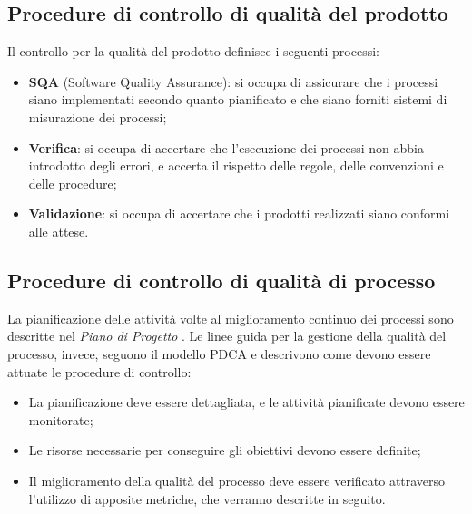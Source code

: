   \subsection{Procedure di controllo di qualità del prodotto}
    Il controllo per la qualità del prodotto definisce i seguenti processi:
    \begin{itemize}
      \item \textbf{SQA} (Software Quality Assurance): si occupa di assicurare
      che i processi siano implementati secondo quanto pianificato e che siano
      forniti sistemi di misurazione dei processi;
      \item \textbf{Verifica}: si occupa di accertare che l’esecuzione dei
      processi non abbia introdotto degli errori, e accerta il rispetto delle
      regole, delle convenzioni e delle procedure;
      \item \textbf{Validazione}: si occupa di accertare che i prodotti
      realizzati siano conformi alle attese.
    \end{itemize}

  \subsection{Procedure di controllo di qualità di processo}
  La pianificazione delle attività volte al miglioramento continuo dei processi
  sono descritte nel \emph{Piano di Progetto \VersionePP{}}. Le linee guida per
  la gestione della qualità del processo, invece, seguono il modello PDCA e
  descrivono come devono essere attuate le procedure di controllo:
  \begin{itemize}
    \item La pianificazione deve essere dettagliata, e le attività pianificate
    devono essere monitorate;
    \item Le risorse necessarie per conseguire gli obiettivi devono essere
    definite;
    \item Il miglioramento della qualità del processo deve essere verificato
    attraverso l’utilizzo di apposite metriche, che verranno descritte in seguito.
  \end{itemize}

